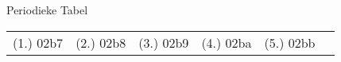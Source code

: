 \begin{eocexercises}{ Periodieke Tabel}
\par \practiceinfo
\par \begin{tabular}[h]{cccccc}
(1.)	02b7	&
(2.)	02b8	&
(3.)	02b9	&
(4.)	02ba	&
(5.)	02bb	&
\end{tabular}
\end{eocexercises}
